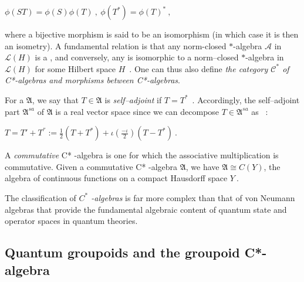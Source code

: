 \documentclass[12pt]{article}
\theoremstyle{plain}
\theoremstyle{definition}
\numberwithin{equation}{section}
\begin{document}
$\phi(ST) = \phi(S) \phi(T)~,~ \phi(T^*) = \phi(T)^*~, $ 

where a bijective morphism  is said to be an isomorphism (in which case it is then an
isometry). A fundamental relation is that any norm-closed $*$-algebra $\mathcal A$ in 
$\mathcal L(H)$ is a , and conversely, any  is isomorphic to a norm--closed $*$-algebra in $\mathcal L(H)$ for some Hilbert space $H$~.
One can thus also define \emph{the category $\mathcal{C}^*$ of C*-algebras  and morphisms between C*-algebras}. 


 For a  $\mathfrak A$, we say that $T \in \mathfrak A$ is \emph{self--adjoint} if $T 
= T^*$~. Accordingly, the self--adjoint part $\mathfrak A^{sa}$ of $\mathfrak A$ is a real 
vector space since we can decompose $T \in \mathfrak A^{sa}$ as ~:

$ T = T' + T^{''} := \frac{1}{2} (T + T^*) + \iota (\frac{-\iota}{2})(T - T^*)~.$

 A \emph{commutative} C* -algebra is one for which the associative multiplication is 
commutative. Given a commutative C* -algebra $\mathfrak A$, we have $\mathfrak A \cong C(Y)$, 
the algebra of continuous functions on a compact Hausdorff space $Y~$.

 The classification of {\em $C^*$ -algebras} is far more complex than that of von Neumann algebras that provide
the fundamental algebraic content of quantum state and operator spaces in quantum theories. 

\subsection{Quantum groupoids and the groupoid C*-algebra}
\end{document}
